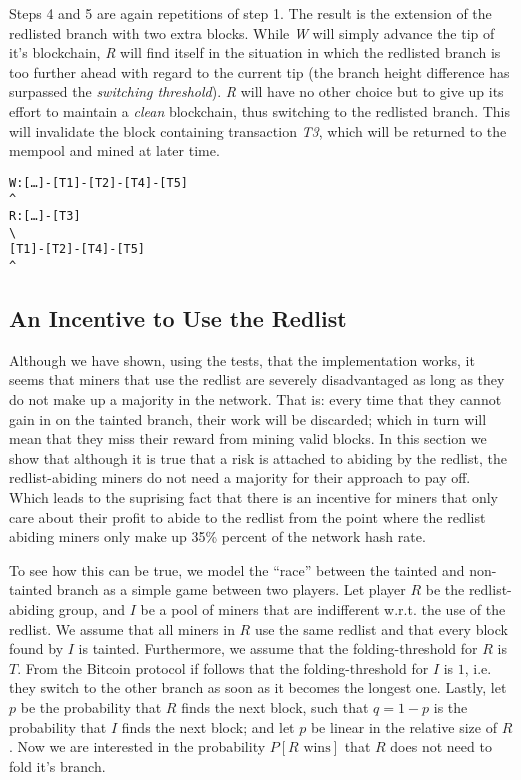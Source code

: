 \documentclass[12pt,journal,compsoc]{IEEEtran}
\begin{document}
Steps 4 and 5 are again repetitions of step 1. The result is the extension of the redlisted branch with two extra blocks. While \emph{W} will simply advance the tip of it's blockchain, \emph{R} will find itself in the situation in which the redlisted branch is too further ahead with regard to the current tip (the branch height difference has surpassed the \emph{switching threshold}). \emph{R} will have no other choice but to give up its effort to maintain a \emph{clean} blockchain, thus switching to the redlisted branch. This will invalidate the block containing transaction \emph{T3}, which will be returned to the mempool and mined at later time.
\newline
 \begin{alltt}
W:   [\ldots]\--\color{red}[T1]\--[T2]\--[T4]\--[T5]\color{black}
      		                    ^
R:   [\ldots]\--\color{darkgreen}[T3]\color{black}
      	   \textbackslash
		           \color{red}[T1]\--[T2]\--[T4]\--[T5]\color{black}
		                           ^
\end{alltt}

\subsection{An Incentive to Use the Redlist}
Although we have shown, using the tests, that the implementation works, it seems that miners that
use the redlist are severely disadvantaged as long as they do not make up a majority in the network.
That is: every time that they cannot gain in on the tainted branch, their work will be discarded;
which in turn will mean that they miss their reward from mining valid blocks.
In this section we show that although it is true that a risk is attached to abiding by the redlist,
the redlist-abiding miners do not need a majority for their approach to pay off.
Which leads to the suprising fact that there is an incentive for miners that only care about their
profit to abide to the redlist from the point where the redlist abiding miners only make up 35\% percent of the network hash rate.

To see how this can be true, we model the ``race'' between the tainted and non-tainted branch as a
simple game between two players.
Let player $R$ be the redlist-abiding group, and $I$ be a pool of miners that are indifferent w.r.t.
the use of the redlist.
We assume that all miners in $R$ use the same redlist and that every block found by $I$ is tainted.
Furthermore, we assume that the folding-threshold for $R$ is $T$.
From the Bitcoin protocol if follows that the folding-threshold for $I$ is $1$, i.e. they switch to
the other branch as soon as it becomes the longest one.
Lastly, let $p$ be the probability that $R$ finds the next block, such that $q = 1-p$ is the
probability that $I$ finds the next block; and let $p$ be linear in the relative size of $R$.
Now we are interested in the probability $P[\text{$R$ wins}]$ that $R$ does not need to fold it's
branch.
\end{document}
